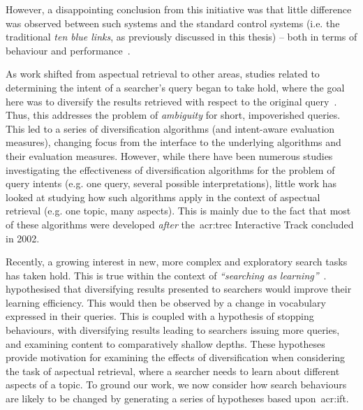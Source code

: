 However, a disappointing conclusion from this initiative was that little difference was observed between such systems and the standard control systems (i.e. the traditional \emph{ten blue links}, as previously discussed in this thesis) -- both in terms of behaviour and performance~\citep{voorhees2005trec_book}.

As work shifted from aspectual retrieval to other areas, studies related to determining the intent of a searcher's query began to take hold, where the goal here was to diversify the results retrieved with respect to the original query~\citep{rose2004understanding_user_goals}. Thus, this addresses the problem of \emph{ambiguity} for short, impoverished queries. This led to a series of diversification algorithms (and intent-aware evaluation measures), changing focus from the interface to the underlying algorithms and their evaluation measures. However, while there have been numerous studies investigating the effectiveness of diversification algorithms for the problem of query intents (e.g. one query, several possible interpretations), little work has looked at studying how such algorithms apply in the context of aspectual retrieval (e.g. one topic, many aspects). This is mainly due to the fact that most of these algorithms were developed \emph{after} the~\gls{acr:trec} Interactive Track concluded in 2002.

Recently, a growing interest in new, more complex and exploratory search tasks has taken hold. This is true within the context of \emph{``searching as learning''}~\citep{collins2017sal}.~\cite{syed2017sal} hypothesised that diversifying results presented to searchers would improve their learning efficiency. This would then be observed by a change in vocabulary expressed in their queries. This is coupled with a hypothesis of stopping behaviours, with diversifying results leading to searchers issuing more queries, and examining content to comparatively shallow depths. These hypotheses provide motivation for examining the effects of diversification when considering the task of aspectual retrieval, where a searcher needs to learn about different aspects of a topic. To ground our work, we now consider how search behaviours are likely to be changed by generating a series of hypotheses based upon~\gls{acr:ift}.

